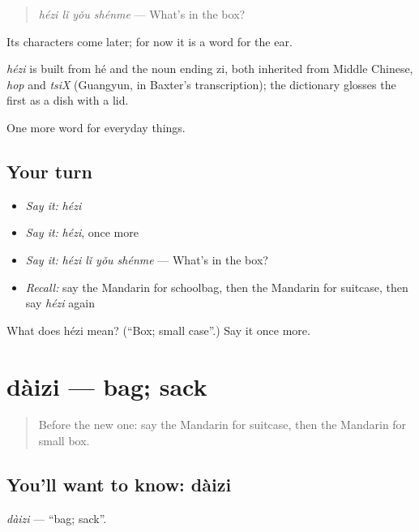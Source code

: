 \begin{quote}
\emph{hézi lǐ yǒu shénme} — What's in the box?
\end{quote}

Its characters come later; for now it is a word for the ear.

\begin{cousinweb}
\emph{hézi} is built from hé and the noun ending zi, both inherited from Middle Chinese, \emph{hop} and \emph{tsiX} (Guangyun, in Baxter's transcription); the dictionary glosses the first as a dish with a lid.
\end{cousinweb}

\begin{grammarlens}[title={What you've built}]
One more word for everyday things.
\end{grammarlens}

\subsection*{Your turn}
\begin{itemize}
\raggedright
  \item \emph{Say it:} \emph{hézi}
  \item \emph{Say it:} \emph{hézi}, once more
  \item \emph{Say it:} \emph{hézi lǐ yǒu shénme} — What's in the box?
  \item \emph{Recall:} say the Mandarin for schoolbag, then the Mandarin for suitcase, then say \emph{hézi} again
\end{itemize}

\begin{tcolorbox}[breakable,colback=teal!4,colframe=teal!35!black,title={Before you move on}]
What does hézi mean? (\textquotedblleft{}Box; small case\textquotedblright{}.) Say it once more.
\end{tcolorbox}
\section[dàizi]{dàizi — bag; sack}

\label{lesson:ZH-C119-daizi}



\begin{quote}
Before the new one: say the Mandarin for suitcase, then the Mandarin for small box.
\end{quote}

\subsection*{You'll want to know: dàizi}
\emph{dàizi} — \textquotedblleft{}bag; sack\textquotedblright{}.

